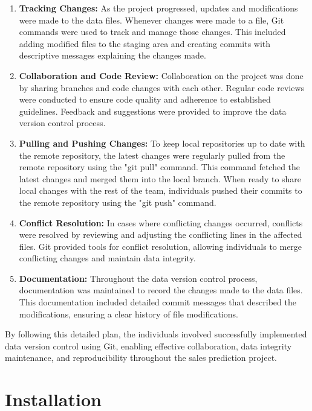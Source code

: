 \begin{enumerate}[label=\textbf{\arabic*.}]
		\item \textbf{Tracking Changes:} As the project progressed, updates and modifications were made to the data files. Whenever changes were made to a file, Git commands were used to track and manage those changes. This included adding modified files to the staging area and creating commits with descriptive messages explaining the changes made.
		
		\item \textbf{Collaboration and Code Review:} Collaboration on the project was done by sharing branches and code changes with each other. Regular code reviews were conducted to ensure code quality and adherence to established guidelines. Feedback and suggestions were provided to improve the data version control process.
		
		\item \textbf{Pulling and Pushing Changes:} To keep local repositories up to date with the remote repository, the latest changes were regularly pulled from the remote repository using the "git pull" command. This command fetched the latest changes and merged them into the local branch. When ready to share local changes with the rest of the team, individuals pushed their commits to the remote repository using the "git push" command.
		
		\item \textbf{Conflict Resolution:} In cases where conflicting changes occurred, conflicts were resolved by reviewing and adjusting the conflicting lines in the affected files. Git provided tools for conflict resolution, allowing individuals to merge conflicting changes and maintain data integrity.
		
		\item \textbf{Documentation:} Throughout the data version control process, documentation was maintained to record the changes made to the data files. This documentation included detailed commit messages that described the modifications, ensuring a clear history of file modifications.
	\end{enumerate}
	
	By following this detailed plan, the individuals involved successfully implemented data version control using Git, enabling effective collaboration, data integrity maintenance, and reproducibility throughout the sales prediction project.
	

	
\section{Installation}

